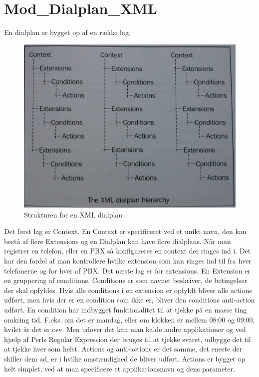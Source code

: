 \section{Mod\_Dialplan\_XML}
En dialplan er bygget op af en række lag.
\begin{figure}[ht!]
\centering
\includegraphics[scale=0.14]{images/dialplanstructure.jpg}
\caption{Strukturen for en XML dialplan\citep{freeswitch12}}
\label{fig:xmldialplan}
\end{figure}
Det først lag er Context. En Context er specificeret ved et unikt navn, den kan bestå af flere Extensions og en Dialplan kan have flere dialplans. Når man registrer en telefon, eller en PBX så konfigureres en context der ringes ind i. Det har den fordel af man kontrollere hvilke extension som kan ringes ind til fra hver telefonerne og for hver af PBX.
Det næste lag er for extensions. En Extension er en gruppering af conditions.
Conditions er som navnet beskriver, de betingelser der skal opfyldes. Hvis alle conditions i en extension er opfyldt bliver alle actions udført, men hvis der er en condition som ikke er, bliver den conditions anti-action udført. En condition har indbygget funktionalitet til at tjekke på en masse ting omkring tid. F.eks. om det er mandag, eller om klokken er mellem 08:00 og 09:00, hvilet år det er osv. Men udover det kan man kalde andre applikationer og ved hjælp af Perls Regular Expression der bruges til at tjekke svaret, udbygge det til at tjekke hver som helst. 
Actions og anti-actions er det samme, det eneste der skiller dem ad, er i hvilke omstændighed de bliver udført. Actions er bygget op helt simplet, ved at man specificere et applikationsnavn og dens parameter.

